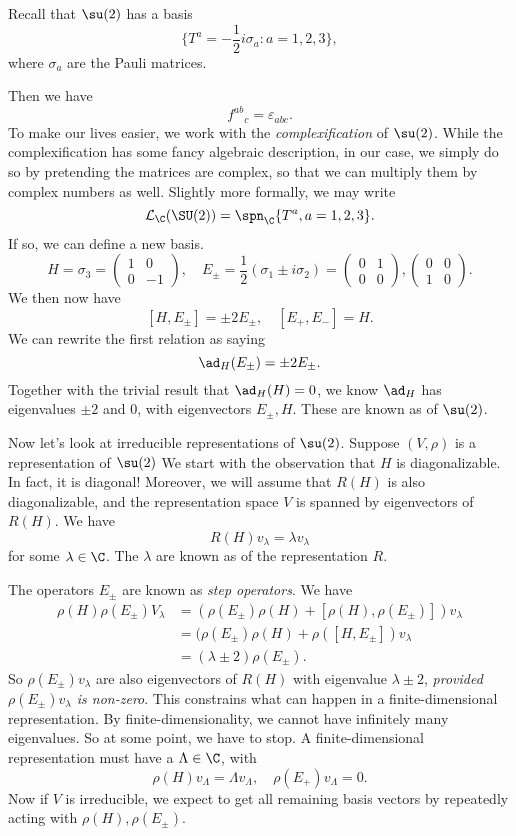 \documentclass[a4paper]{article}
\begin{document}
Recall that $\su(2)$ has a basis
\[
  \{T^a = -\frac{1}{2}i \sigma_a: a = 1, 2, 3\},
\]
where $\sigma_a$ are the Pauli matrices.

Then we have
\[
  f^{ab}\!_c = \varepsilon_{abc}.
\]
To make our lives easier, we work with the \emph{complexification} of $\su(2)$. While the complexification has some fancy algebraic description, in our case, we simply do so by pretending the matrices are complex, so that we can multiply them by complex numbers as well. Slightly more formally, we may write
\[
  \mathcal{L}_\C (\SU(2)) = \spn_\C \{T^a, a = 1, 2, 3\}.
\]
If so, we can define a new basis.
\[
  H = \sigma_3 =
  \begin{pmatrix}
    1 & 0\\
    0 & -1
  \end{pmatrix},\quad E_{\pm} = \frac{1}{2} (\sigma_1 \pm i \sigma_2) =
  \begin{pmatrix}
    0 & 1 \\
    0 & 0
  \end{pmatrix},
  \begin{pmatrix}
    0 & 0\\
    1 & 0
  \end{pmatrix}.
\]
We then now have
\[
  [H, E_{\pm}] = \pm 2 E_{\pm},\quad [E_+, E_-] = H.
\]
We can rewrite the first relation as saying
\[
  \ad_H(E_{\pm}) = \pm 2 E_{\pm}.
\]
Together with the trivial result that $\ad_H(H) = 0$, we know $\ad_H$ has eigenvalues $\pm 2$ and $0$, with eigenvectors $E_{\pm}, H$. These are known as  of $\su(2)$.

Now let's look at irreducible representations of $\su(2)$. Suppose $(V, \rho)$ is a representation of $\su(2)$ We start with the observation that $H$ is diagonalizable. In fact, it is diagonal! Moreover, we will assume that $R(H)$ is also diagonalizable, and the representation space $V$ is spanned by eigenvectors of $R(H)$. We have
\[
  R(H) v_\lambda = \lambda v_\lambda
\]
for some $\lambda \in \C$. The $\lambda$ are known as  of the representation $R$.

The operators $E_{\pm}$ are known as \emph{step operators}. We have
\begin{align*}
  \rho(H) \rho(E_{\pm}) V_\lambda &= (\rho(E_{\pm})\rho(H) + [\rho(H), \rho(E_{\pm})])v_\lambda \\
  &= (\rho(E_{\pm})\rho(H) + \rho([H, E_{\pm}]) v_\lambda \\
  &= (\lambda \pm 2) \rho(E_{\pm}).
\end{align*}
So $\rho(E_{\pm}) v_\lambda$ are also eigenvectors of $R(H)$ with eigenvalue $\lambda \pm 2$, \emph{provided $\rho(E_{\pm})v_\lambda$ is non-zero}. This constrains what can happen in a finite-dimensional representation. By finite-dimensionality, we cannot have infinitely many eigenvalues. So at some point, we have to stop. A finite-dimensional representation must have a  $\Lambda \in \C$, with
\[
  \rho(H)v_\Lambda = \Lambda v_\Lambda,\quad \rho(E_+) v_\Lambda = 0.
\]
Now if $V$ is irreducible, we expect to get all remaining basis vectors by repeatedly acting with $\rho(H), \rho(E_{\pm})$.
\end{document}
